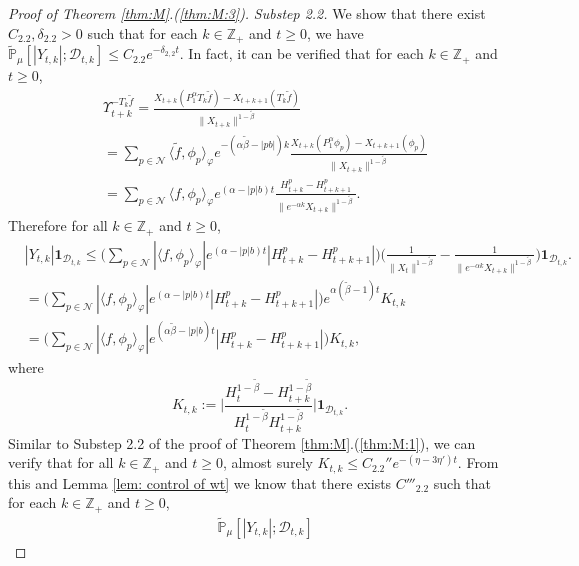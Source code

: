 \documentclass[12pt,a4paper]{amsart}
\theoremstyle{plain}
\theoremstyle{definition}
\numberwithin{equation}{section}
\begin{document}
\begin{proof}[Proof of Theorem \ref{thm:M}.(\ref{thm:M:3})]
\emph{Substep 2.2.} We show that there exist $C_{2.2}, \delta_{2.2}>0$ such that for each $k \in \mathbb Z_+$ and $t\geq 0$, we have $\widetilde {\mathbb {P}}_\mu[|Y_{t,k}|; \mathcal D_{t,k}]\leq C_{2.2}e^{- \delta_{2,2} t}$.
In fact, it can be verified that for each $k \in \mathbb Z_+$ and $t\geq 0$,
\begin{align}
& \Upsilon_{t+k}^{-T_k\tilde f}
  = \frac{X_{t+k}(P^\alpha_1T_k\tilde f) - X_{t+k+1}(T_k \tilde f)}{\|X_{t+k}\|^{1 - \tilde \beta}}
 \\& = \sum_{p\in \mathcal N}
  \langle\tilde f,\phi_p\rangle_\varphi e^{-(\alpha \tilde \beta - |pb|)k}\frac{ X_{t+k}(P_1^\alpha \phi_p) - X_{t+k+1}(\phi_p)}{\|X_{t+k}\|^{1 - \tilde \beta}}
 \\& = \sum_{p\in \mathcal N}
  \langle f,\phi_p\rangle_\varphi  e^{(\alpha  -|p|b)t}\frac{H_{t+k}^p-H_{t+k+1}^p }{\|e^{-\alpha k}X_{t+k}\|^{1 - \tilde \beta}}.
\end{align}
Therefore for all $k\in \mathbb Z_+$ and $t\geq 0$,
\begin{align}
 &|Y_{t,k}| \mathbf 1_{\mathcal D_{t,k}}
  \leq \Big( \sum_{p\in \mathcal N}|\langle f,\phi_p\rangle_\varphi|  e^{(\alpha  -|p|b)t} | H_{t+k}^p-H_{t+k+1}^p |\Big) \Big( \frac{1}{\|X_t\|^{1 - \tilde \beta}} - \frac{1}{\|e^{-\alpha k}X_{t+k}\|^{1 - \tilde \beta}} \Big)\mathbf 1_{\mathcal D_{t,k}}.
    \\ &= \Big( \sum_{p\in \mathcal N}|\langle f,\phi_p\rangle_\varphi|  e^{(\alpha  -|p|b)t} | H_{t+k}^p-H_{t+k+1}^p |\Big)e^{\alpha (\tilde \beta - 1)t} K_{t,k}
  \\ &= \Big( \sum_{p\in \mathcal N}|\langle f,\phi_p\rangle_\varphi|  e^{(\alpha \tilde \beta  -|p|b)t} | H_{t+k}^p-H_{t+k+1}^p |\Big) K_{t,k},
\end{align}
where
\[
  K_{t,k}
  := \Big| \frac {H_t^{1- \tilde \beta} - H_{t+k}^{1 - \tilde \beta}} {H_t^{1 - \tilde \beta} H_{t+k}^{ 1- \tilde \beta }} \Big| \mathbf{1}_{\mathcal{D}_{t,k}}.
\]
Similar to Substep 2.2 of
the proof of Theorem \ref{thm:M}.(\ref{thm:M:1}), we can verify that for all $k\in \mathbb Z_+$ and $t\geq 0$, almost surely $K_{t,k} \leq C_{2.2}'' e^{- (\eta - 3\eta')t}$.
From this and Lemma \ref{lem: control of wt} we know that there exists $C'''_{2.2}$ such that for each $k\in \mathbb Z_+$ and $t\geq 0$,
\begin{align}
  & \widetilde{\mathbb P}_\mu[|Y_{t,k}|; \mathcal D_{t,k}]

\end{align}
\end{proof}
\end{document}
